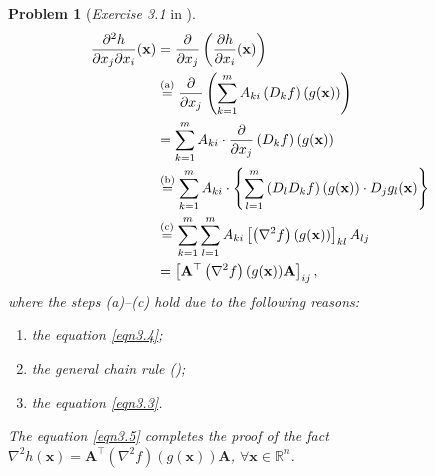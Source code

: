 \documentclass[11pt]{article}
\newtheorem{problem}{Problem}
\begin{document}
\begin{problem} [\emph{Exercise 3.1} in \cite{calafiore2014optimization}]
{\begin{equation}
    \label{eqn3.5}
    \begin{split}
        \frac{\partial^2 h}{\partial x_j \partial x_i} (\mathbf{x})
        &= \frac{\partial}{\partial x_j} \left( \frac{\partial h}{\partial x_i} (\mathbf{x}) \right) \\
        &\stackrel{\textnormal{(a)}}{=} \frac{\partial}{\partial x_j} \left( \sum_{k=1}^{m} A_{ki} \left( D_k f \right) (g(\mathbf{x})) \right) \\
        &= \sum_{k=1}^{m} A_{ki} \cdot \frac{\partial}{\partial x_j} \left( D_k f \right) (g(\mathbf{x})) \\
        &\stackrel{\textnormal{(b)}}{=} \sum_{k=1}^{m} A_{ki} \cdot \left\{ \sum_{l=1}^{m} \left( D_l D_k f \right)(g (\mathbf{x})) \cdot D_j g_l(\mathbf{x}) \right\} \\
        &\stackrel{\textnormal{(c)}}{=} \sum_{k=1}^{m} \sum_{l=1}^{m} A_{ki} \left[ \left( \nabla^2 f \right) (g(\mathbf{x})) \right]_{kl} A_{lj} \\
        &= \left[ \mathbf{A}^{\top} \left( \nabla^2 f \right) (g(\mathbf{x})) \mathbf{A} \right]_{ij},
    \end{split}
\end{equation}
where the steps (a)--(c) hold due to the following reasons:
\begin{enumerate} [label=(\alph*)]
    \item the equation \eqref{eqn3.4};
    \item the general chain rule ();
    \item the equation \eqref{eqn3.3}.
\end{enumerate}
The equation \eqref{eqn3.5} completes the proof of the fact $\nabla^2 h (\mathbf{x}) = \mathbf{A}^{\top} \left( \nabla^2 f \right) (g(\mathbf{x})) \mathbf{A}$, $\forall \mathbf{x} \in \mathbb{R}^n$.
}
\end{problem}
\end{document}
